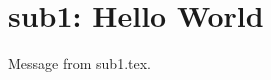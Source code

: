 \documentclass[main.tex]{subfiles}
\begin{document}
\chapter{sub1: Hello World}
Message from sub1.tex.
\end{document}
